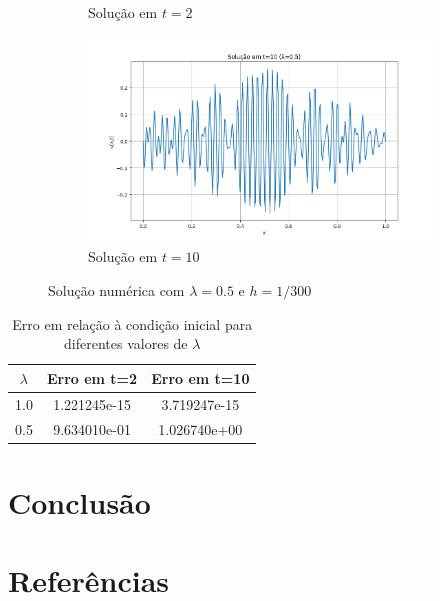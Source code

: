 \documentclass[column,amsmath,amssymb,floatfix]{revtex4}
\begin{document}
\begin{figure}[H]
\begin{subfigure}{0.35\textwidth}
     \caption{Solução em $t=2$}
     \label{fig:ex3_7}
 \end{subfigure}
 \begin{subfigure}{0.35\textwidth}
     \includegraphics[width=\textwidth]{img/ex0308.png}
     \caption{Solução em $t=10$}
     \label{fig:ex3_8}
 \end{subfigure}
 \caption{Solução numérica com $\lambda=0.5$ e $h=1/300$}
 \label{fig:ex3_lambda05}
\end{figure}

\begin{table}[H]
   \centering
   \caption{Erro em relação à condição inicial para diferentes valores de $\lambda$}
   \label{tab:erro_lambda}
   \renewcommand{\arraystretch}{1.25}
   \setlength{\tabcolsep}{12pt}
   \begin{tabular}{|c|c|c|}
       \hline
       \textbf{$\lambda$} & \textbf{Erro em t=2} & \textbf{Erro em t=10} \\ \hline
       1.0 & 1.221245e-15 & 3.719247e-15 \\ \hline
       0.5 & 9.634010e-01 & 1.026740e+00 \\ \hline
   \end{tabular}
\end{table}

\section{Conclusão}
\section{Referências}
\end{document}
